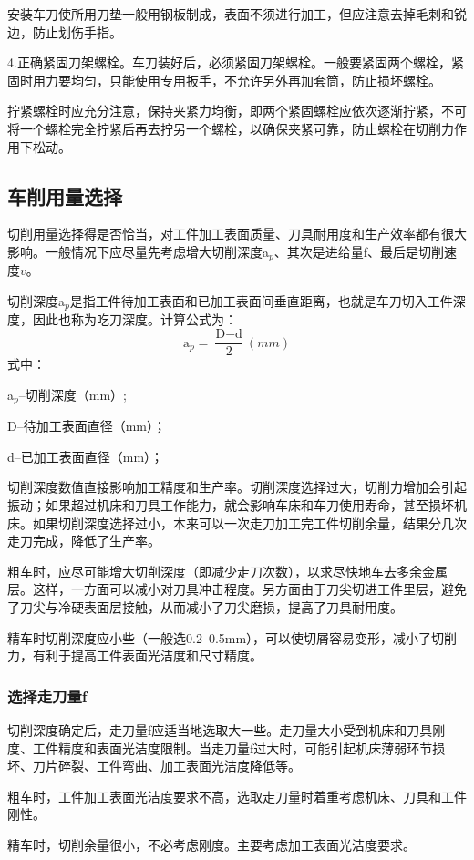 \documentclass{ctexbook}
\begin{document}
安装车刀使所用刀垫一般用钢板制成，表面不须进行加工，但应注意去掉毛刺和锐边，防止划伤手指。

4.正确紧固刀架螺栓。车刀装好后，必须紧固刀架螺栓。一般要紧固两个螺栓，紧固时用力要均匀，只能使用专用扳手，不允许另外再加套筒，防止损坏螺栓。

拧紧螺栓时应充分注意，保持夹紧力均衡，即两个紧固螺栓应依次逐渐拧紧，不可将一个螺栓完全拧紧后再去拧另一个螺栓，以确保夹紧可靠，防止螺栓在切削力作用下松动。
\subsection{车削用量选择}
切削用量选择得是否恰当，对工件加工表面质量、刀具耐用度和生产效率都有很大影响。一般情况下应尽量先考虑增大切削深度a$_p$、其次是进给量f、最后是切削速度$v$。

切削深度a$_p$是指工件待加工表面和已加工表面间垂直距离，也就是车刀切入工件深度，因此也称为吃刀深度。计算公式为：
\begin{equation*}
	\text{a}_p=\frac{\text{D}-\text{d}}{2} (mm)
\end{equation*}
式中：

a$_p$--切削深度（mm）;

D--待加工表面直径（mm）；

d--已加工表面直径（mm）；

切削深度数值直接影响加工精度和生产率。切削深度选择过大，切削力增加会引起振动；如果超过机床和刀具工作能力，就会影响车床和车刀使用寿命，甚至损坏机床。如果切削深度选择过小，本来可以一次走刀加工完工件切削余量，结果分几次走刀完成，降低了生产率。

粗车时，应尽可能增大切削深度（即减少走刀次数），以求尽快地车去多余金属层。这样，一方面可以减小对刀具冲击程度。另方面由于刀尖切进工件里层，避免了刀尖与冷硬表面层接触，从而减小了刀尖磨损，提高了刀具耐用度。

精车时切削深度应小些（一般选0.2--0.5mm），可以使切屑容易变形，减小了切削力，有利于提高工件表面光洁度和尺寸精度。
\subsubsection{选择走刀量f}
切削深度确定后，走刀量f应适当地选取大一些。走刀量大小受到机床和刀具刚度、工件精度和表面光洁度限制。当走刀量f过大时，可能引起机床薄弱环节损坏、刀片碎裂、工件弯曲、加工表面光洁度降低等。

粗车时，工件加工表面光洁度要求不高，选取走刀量时着重考虑机床、刀具和工件刚性。

精车时，切削余量很小，不必考虑刚度。主要考虑加工表面光洁度要求。
\end{document}
